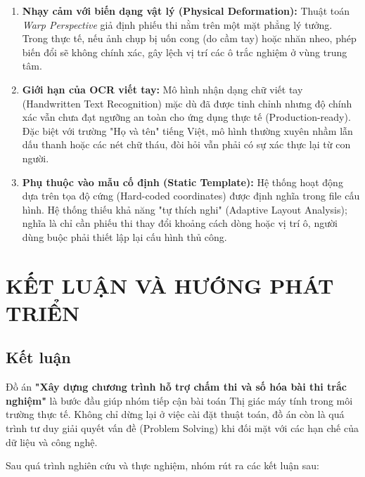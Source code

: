 \documentclass[6pt, a4paper]{report}
\begin{document}
	\begin{enumerate}
		\item \textbf{Nhạy cảm với biến dạng vật lý (Physical Deformation):} 
		Thuật toán \textit{Warp Perspective} giả định phiếu thi nằm trên một mặt phẳng lý tưởng. Trong thực tế, nếu ảnh chụp bị uốn cong (do cầm tay) hoặc nhăn nheo, phép biến đổi sẽ không chính xác, gây lệch vị trí các ô trắc nghiệm ở vùng trung tâm.
		
		\item \textbf{Giới hạn của OCR viết tay:} 
		Mô hình nhận dạng chữ viết tay (Handwritten Text Recognition) mặc dù đã được tinh chỉnh nhưng độ chính xác vẫn chưa đạt ngưỡng an toàn cho ứng dụng thực tế (Production-ready). Đặc biệt với trường "Họ và tên" tiếng Việt, mô hình thường xuyên nhầm lẫn dấu thanh hoặc các nét chữ tháu, đòi hỏi vẫn phải có sự xác thực lại từ con người.
		
		\item \textbf{Phụ thuộc vào mẫu cố định (Static Template):} 
		Hệ thống hoạt động dựa trên tọa độ cứng (Hard-coded coordinates) được định nghĩa trong file cấu hình. Hệ thống thiếu khả năng "tự thích nghi" (Adaptive Layout Analysis); nghĩa là chỉ cần phiếu thi thay đổi khoảng cách dòng hoặc vị trí ô, người dùng buộc phải thiết lập lại cấu hình thủ công.
	\end{enumerate}
	
	\chapter{KẾT LUẬN VÀ HƯỚNG PHÁT TRIỂN}
	
	\section{Kết luận}
	
	Đồ án \textbf{"Xây dựng chương trình hỗ trợ chấm thi và số hóa bài thi trắc nghiệm"} là bước đầu giúp nhóm tiếp cận bài toán Thị giác máy tính trong môi trường thực tế. Không chỉ dừng lại ở việc cài đặt thuật toán, đồ án còn là quá trình tư duy giải quyết vấn đề (Problem Solving) khi đối mặt với các hạn chế của dữ liệu và công nghệ.
	
	Sau quá trình nghiên cứu và thực nghiệm, nhóm rút ra các kết luận sau:
	
\end{document}
